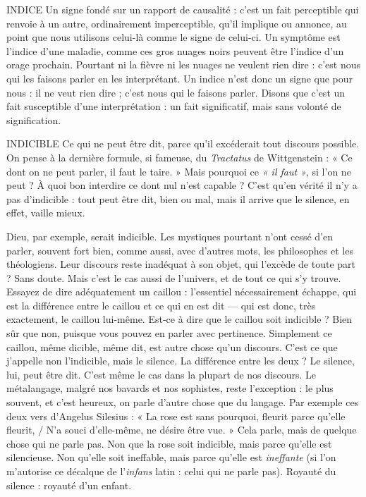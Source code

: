 INDICE Un signe fondé sur un rapport de causalité : c’est un fait perceptible
qui renvoie à un autre, ordinairement imperceptible, qu’il
implique ou annonce, au point que nous utilisons celui-là comme le signe de
celui-ci. Un symptôme est l'indice d’une maladie, comme ces gros nuages noirs
peuvent être l’indice d’un orage prochain. Pourtant ni la fièvre ni les nuages ne
veulent rien dire : c’est nous qui les faisons parler en les interprétant. Un indice
n’est donc un signe que pour nous : il ne veut rien dire ; c’est nous qui le faisons
parler. Disons que c’est un fait susceptible d’une interprétation : un fait
significatif, mais sans volonté de signification.

INDICIBLE Ce qui ne peut être dit, parce qu’il excéderait tout discours
possible. On pense à la dernière formule, si fameuse, du {\it Tractatus}
de Wittgenstein : « Ce dont on ne peut parler, il faut le taire. » Mais pourquoi
ce {\it « il faut »}, si l’on ne peut ? À quoi bon interdire ce dont nul n’est
capable ? C’est qu’en vérité il n’y a pas d’indicible : tout peut être dit, bien ou
mal, mais il arrive que le silence, en effet, vaille mieux.

Dieu, par exemple, serait indicible. Les mystiques pourtant n’ont cessé d’en
parler, souvent fort bien, comme aussi, avec d’autres mots, les philosophes et
les théologiens. Leur discours reste inadéquat à son objet, qui l’excède de toute
part ? Sans doute. Mais c’est le cas aussi de l’univers, et de tout ce qui s’y
trouve. Essayez de dire adéquatement un caillou : l’essentiel nécessairement
échappe, qui est la différence entre le caillou et ce qui en est dit — qui est donc,
très exactement, le caillou lui-même. Est-ce à dire que le caillou soit indicible ?
Bien sûr que non, puisque vous pouvez en parler avec pertinence. Simplement
ce caillou, même dicible, même dit, est autre chose qu’un discours. C’est ce que
j'appelle non l’indicible, mais le silence. La différence entre les deux ? Le
silence, lui, peut être dit. C’est même le cas dans la plupart de nos discours. Le
métalangage, malgré nos bavards et nos sophistes, reste l’exception : le plus
souvent, et c’est heureux, on parle d’autre chose que du langage. Par exemple
ces deux vers d’Angelus Silesius : « La rose est sans pourquoi, fleurit parce
qu’elle fleurit, / N’a souci d’elle-même, ne désire être vue. » Cela parle, mais de
quelque chose qui ne parle pas. Non que la rose soit indicible, mais parce
qu’elle est silencieuse. Non qu’elle soit ineffable, mais parce qu’elle est {\it ineffante}
(si l’on m’autorise ce décalque de l’{\it infans} latin : celui qui ne parle pas). Royauté
du silence : royauté d’un enfant.

